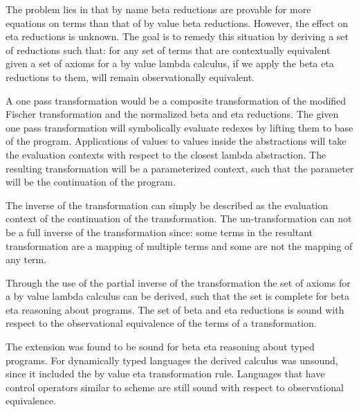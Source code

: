 The problem lies in that by name beta reductions are provable for more equations on \cps terms than that of by value beta reductions.  However, the effect on eta reductions is unknown. The goal is to remedy this situation by deriving a set of reductions such that: for any set of terms that are contextually equivalent given a set of axioms for a by value lambda calculus, if we apply the beta eta reductions to them, will remain observationally equivalent.

A one pass \cps transformation would be a composite transformation of the modified Fischer transformation and the normalized beta and eta reductions.  The given one pass transformation will symbolically evaluate redexes by lifting them to base of the program. Applications of values to values inside the abstractions will take the evaluation contexts with respect to the closest lambda abstraction. The resulting transformation will be a parameterized context, such that the parameter will be the continuation of the program.

The inverse of the \cps transformation can simply be described as the evaluation context of the continuation of the \cps transformation. The un-\cps transformation can not be a full inverse of the \cps transformation since:  some terms in the resultant transformation are a mapping of multiple terms and some are not the mapping of any term.

Through the use of the partial inverse of the \cps transformation the set of axioms for a by value lambda calculus can be derived, such that the set is complete for beta eta reasoning about \cps programs.  The set of beta and eta reductions is sound with respect to the observational equivalence of the terms of a \cps transformation.

The extension was found to be sound for beta eta reasoning about typed \cps programs.  For dynamically typed languages the derived calculus was unsound, since it included the by value eta transformation rule.  Languages that have control operators similar to scheme are still sound with respect to observational equivalence.



